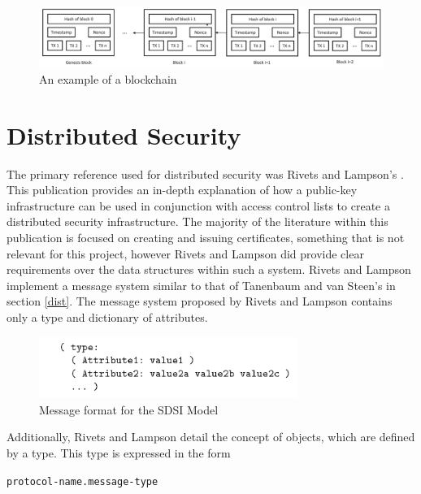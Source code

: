 \documentclass[a4paper, 11pt]{report}
\begin{document}
\begin{center}
	\begin{figure}[H]
		\includegraphics[width=\textwidth,keepaspectratio]{NoferBlock}
		\caption{An example of a \gls{blockchain} \cite{blockchain}} 
		\label{fig:blockchain2}
	\end{figure}
\end{center}

\section{Distributed Security}
The primary reference used for distributed security was Rivets and Lampson's  \cite{sdsi}. This publication provides an in-depth explanation of how a public-key infrastructure can be used in conjunction with access control lists to create a distributed security infrastructure. The majority of the literature within this publication is focused on creating and issuing certificates, something that is not relevant for this project, however Rivets and Lampson did provide clear requirements over the data structures within such a system. Rivets and Lampson implement a message system similar to that of Tanenbaum and van Steen's in section \ref{dist}. The message system proposed by Rivets and Lampson contains only a type and dictionary of attributes.

\begin{figure}[H]
\centering
\includegraphics[height=2cm,keepaspectratio]{distmsg}
\caption{Message format for the SDSI Model \cite{sdsi}} 
\label{fig:sdsimessage}
\end{figure}

Additionally, Rivets and Lampson detail the concept of objects, which are defined by a type. This type is expressed in the form 

\begin{center} 
\texttt{protocol-name.message-type}
\end{center}
\end{document}
